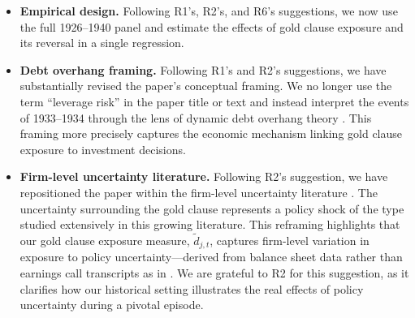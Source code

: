 \begin{itemize}
\item \textbf{Empirical design.} Following R1's, R2's, and R6's suggestions, we now use the full 1926--1940 panel and estimate the effects of gold clause exposure and its reversal in a single regression.

\item \textbf{Debt overhang framing.} Following R1's and R2's suggestions, we have substantially revised the paper's conceptual framing. We no longer use the term ``leverage risk'' in the paper title or text and instead interpret the events of 1933--1934 through the lens of dynamic debt overhang theory \citep{Hennessy2004}. This framing more precisely captures the economic mechanism linking gold clause exposure to investment decisions.

\item \textbf{Firm-level uncertainty literature.} Following R2's suggestion, we have repositioned the paper within the firm-level uncertainty literature \citep{Bloom2009, Baker2016, Hassan2019}. The uncertainty surrounding the gold clause represents a policy shock of the type studied extensively in this growing literature. This reframing highlights that our gold clause exposure measure, $\tilde{d}_{j,t}$, captures firm-level variation in exposure to policy uncertainty---derived from balance sheet data rather than earnings call transcripts as in \citep{Hassan2019}. We are grateful to R2 for this suggestion, as it clarifies how our historical setting illustrates the real effects of policy uncertainty during a pivotal episode.
\end{itemize}
